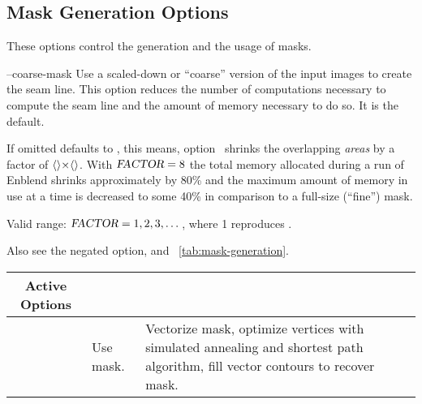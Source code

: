 

\subsection[Mask Generation Options]{\label{sec:mask-generation-options}%
  Mask Generation Options}

These options control the generation and the usage of masks.

\begin{codelist}
  \label{opt:coarse-mask}%
\item[--coarse-mask\optional{=\metavar{FACTOR}}]\itemend
  Use a scaled-down or ``coarse'' version of the input images to create the seam line.  This
  option reduces the number of computations necessary to compute the seam line and the amount of
  memory necessary to do so.  It is the default.

  If omitted  defaults to , this means,
  option~ shrinks the overlapping \emph{areas} by a factor of
  $\val{val:default-coarseness-factor}\classictimes \val{val:default-coarseness-factor}$.  With
  $\textsl{FACTOR} = 8$ the total memory allocated during a run of Enblend shrinks
  approximately by 80\% and the maximum amount of memory in use at a time is decreased to some
  40\% in comparison to a full-size (``fine'') mask.

  Valid range: $\textsl{FACTOR} = 1, 2, 3, \dots$, where 1 reproduces .

  Also see the negated option,  and
  \tableName~\ref{tab:mask-generation}.

  \begin{table}
    \begin{tabular}{lp{.3\linewidth}p{.4\linewidth}}
      \hline
      \multicolumn{1}{c|}{Active Options} &
      \multicolumn{1}{c|}{\option{--no-optimize}} &
      \multicolumn{1}{c}{\option{--optimize}} \\
      \hline\extraheadingsep
      \option{--fine-mask} & Use \acronym{NFT} mask. & Vectorize \acronym{NFT} mask, optimize
      vertices with simulated annealing and \propername{Dijkstra's} shortest path algorithm,
      fill vector contours to recover mask. \\


\end{tabular}
\end{table}
\end{codelist}
